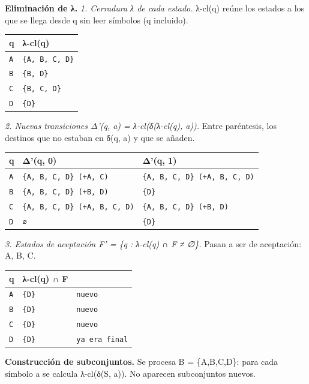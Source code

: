 \documentclass[11pt]{article}
\begin{document}
\textbf{Eliminación de λ.} \textit{1. Cerradura λ de cada estado.} λ-cl(q) reúne los estados a los que se llega desde q sin leer símbolos (q incluido).
\begin{center}\footnotesize\begin{tabular}{ll}\toprule
q & λ-cl(q) \\\midrule
\texttt{A} & \texttt{\{A, B, C, D\}} \\
\texttt{B} & \texttt{\{B, D\}} \\
\texttt{C} & \texttt{\{B, C, D\}} \\
\texttt{D} & \texttt{\{D\}} \\
\bottomrule\end{tabular}\end{center}
\textit{2. Nuevas transiciones Δ'(q, a) = λ-cl(δ(λ-cl(q), a)).} Entre paréntesis, los destinos que no estaban en δ(q, a) y que se añaden.
\begin{center}\footnotesize\begin{tabular}{lll}\toprule
q & Δ'(q, 0) & Δ'(q, 1) \\\midrule
\texttt{A} & \texttt{\{A, B, C, D\}  (+A, C)} & \texttt{\{A, B, C, D\}  (+A, B, C, D)} \\
\texttt{B} & \texttt{\{A, B, C, D\}  (+B, D)} & \texttt{\{D\}} \\
\texttt{C} & \texttt{\{A, B, C, D\}  (+A, B, C, D)} & \texttt{\{A, B, C, D\}  (+B, D)} \\
\texttt{D} & \texttt{∅} & \texttt{\{D\}} \\
\bottomrule\end{tabular}\end{center}
\textit{3. Estados de aceptación F' = \{q : λ-cl(q) ∩ F ≠ ∅\}.} Pasan a ser de aceptación: A, B, C.
\begin{center}\footnotesize\begin{tabular}{lll}\toprule
q & λ-cl(q) ∩ F &  \\\midrule
\texttt{A} & \texttt{\{D\}} & \texttt{nuevo} \\
\texttt{B} & \texttt{\{D\}} & \texttt{nuevo} \\
\texttt{C} & \texttt{\{D\}} & \texttt{nuevo} \\
\texttt{D} & \texttt{\{D\}} & \texttt{ya era final} \\
\bottomrule\end{tabular}\end{center}
\textbf{Construcción de subconjuntos.} Se procesa B = \{A,B,C,D\}: para cada símbolo a se calcula λ-cl(δ(S, a)). No aparecen subconjuntos nuevos.
\end{document}

